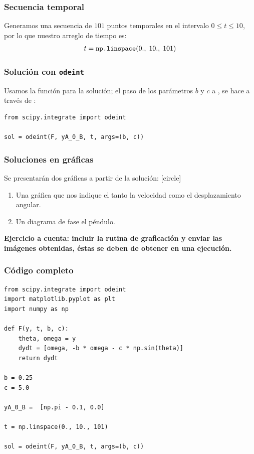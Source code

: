\begin{frame}
\frametitle{Secuencia temporal}
Generamos una secuencia de $101$ puntos temporales en el intervalo $0 \leq t \leq 10$, por lo que nuestro arreglo de tiempo es:
\begin{align*}
t =  \text{\texttt{np.linspace}}(0., \; 10., \; 101)
\end{align*}
\end{frame}
\begin{frame}[fragile]
\frametitle{Solución con \texttt{odeint}}
Usamos la función  para la solución; el paso de los parámetros $b$ y $c$ a , se hace a través de :
\begin{lstlisting}[caption=Solución al problema del péndulo con odeint, style=codigopython]
from scipy.integrate import odeint

sol = odeint(F, yA_0_B, t, args=(b, c))
\end{lstlisting}
\end{frame}
\begin{frame}
\frametitle{Soluciones en gráficas}
Se presentarán dos gráficas a partir de la solución:
[circle]
\begin{enumerate}[<+->]
\item Una gráfica que nos indique el tanto la velocidad como el desplazamiento angular.
\item Un diagrama de fase el péndulo.
\end{enumerate}
\textbf{Ejercicio a cuenta: incluir la rutina de graficación  y enviar las imágenes obtenidas, éstas se deben de obtener en una ejecución.}
\end{frame}
\begin{frame}
\frametitle{Código completo}
\begin{lstlisting}[caption=Función a integrar, style=codigopython]
from scipy.integrate import odeint
import matplotlib.pyplot as plt
import numpy as np

def F(y, t, b, c):
    theta, omega = y
    dydt = [omega, -b * omega - c * np.sin(theta)]
    return dydt

b = 0.25
c = 5.0

yA_0_B =  [np.pi - 0.1, 0.0]

t = np.linspace(0., 10., 101)

sol = odeint(F, yA_0_B, t, args=(b, c))
\end{lstlisting}
\end{frame}
